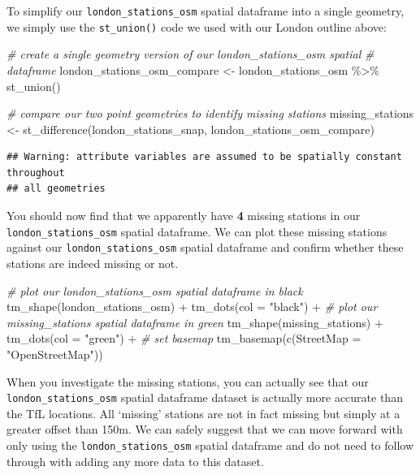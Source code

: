 \documentclass[
]{book}
\newenvironment{Shaded}{\begin{snugshade}}{\end{snugshade}}
\newcommand{\AttributeTok}[1]{\textcolor[rgb]{0.77,0.63,0.00}{#1}}
\newcommand{\CommentTok}[1]{\textcolor[rgb]{0.56,0.35,0.01}{\textit{#1}}}
\newcommand{\FunctionTok}[1]{\textcolor[rgb]{0.00,0.00,0.00}{#1}}
\newcommand{\NormalTok}[1]{#1}
\newcommand{\OtherTok}[1]{\textcolor[rgb]{0.56,0.35,0.01}{#1}}
\newcommand{\SpecialCharTok}[1]{\textcolor[rgb]{0.00,0.00,0.00}{#1}}
\newcommand{\StringTok}[1]{\textcolor[rgb]{0.31,0.60,0.02}{#1}}
\begin{document}
To simplify our \texttt{london\_stations\_osm} spatial dataframe into a single geometry, we simply use the \texttt{st\_union()} code we used with our London outline above:

\begin{Shaded}
\begin{Highlighting}[]
\CommentTok{\# create a single geometry version of our london\_stations\_osm spatial}
\CommentTok{\# dataframe}
\NormalTok{london\_stations\_osm\_compare }\OtherTok{\textless{}{-}}\NormalTok{ london\_stations\_osm }\SpecialCharTok{\%\textgreater{}\%}
    \FunctionTok{st\_union}\NormalTok{()}

\CommentTok{\# compare our two point geometries to identify missing stations}
\NormalTok{missing\_stations }\OtherTok{\textless{}{-}} \FunctionTok{st\_difference}\NormalTok{(london\_stations\_snap, london\_stations\_osm\_compare)}
\end{Highlighting}
\end{Shaded}

\begin{verbatim}
## Warning: attribute variables are assumed to be spatially constant throughout
## all geometries
\end{verbatim}

You should now find that we apparently have \textbf{4} missing stations in our \texttt{london\_stations\_osm} spatial dataframe. We can plot these missing stations against our \texttt{london\_stations\_osm} spatial dataframe and confirm whether these stations are indeed missing or not.

\begin{Shaded}
\begin{Highlighting}[]
\CommentTok{\# plot our london\_stations\_osm spatial dataframe in black}
\FunctionTok{tm\_shape}\NormalTok{(london\_stations\_osm) }\SpecialCharTok{+} \FunctionTok{tm\_dots}\NormalTok{(}\AttributeTok{col =} \StringTok{"black"}\NormalTok{) }\SpecialCharTok{+}
  \CommentTok{\# plot our missing\_stations spatial dataframe in green}
  \FunctionTok{tm\_shape}\NormalTok{(missing\_stations) }\SpecialCharTok{+} \FunctionTok{tm\_dots}\NormalTok{(}\AttributeTok{col =} \StringTok{"green"}\NormalTok{) }\SpecialCharTok{+}
  \CommentTok{\# set basemap}
  \FunctionTok{tm\_basemap}\NormalTok{(}\FunctionTok{c}\NormalTok{(}\AttributeTok{StreetMap =} \StringTok{"OpenStreetMap"}\NormalTok{))}
\end{Highlighting}
\end{Shaded}

When you investigate the missing stations, you can actually see that our \texttt{london\_stations\_osm} spatial dataframe dataset is actually more accurate than the TfL locations. All `missing' stations are not in fact missing but simply at a greater offset than 150m. We can safely suggest that we can move forward with only using the \texttt{london\_stations\_osm} spatial dataframe and do not need to follow through with adding any more data to this dataset.
\end{document}
